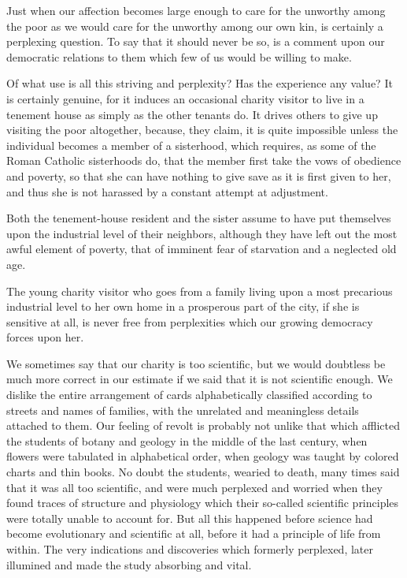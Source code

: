 \documentclass[]{article}
\begin{document}
\begin{sectionbody}
\addamsparagraph Just when our affection becomes large enough to care for the unworthy
among the poor as we would care for the unworthy among our own kin, is
certainly a perplexing question. To say that it should never be so, is a
comment upon our democratic relations to them which few of us would be
willing to make.

\addamsparagraph Of what use is all this striving and perplexity? Has the experience any
value? It is certainly genuine, for it induces an occasional charity
visitor to live in a tenement house as simply as the other tenants do.
It drives others to give up visiting the poor altogether, because, they
claim, it is quite impossible unless the individual becomes a member of
a sisterhood, which requires, as some of the Roman Catholic sisterhoods
do, that the member first take the vows of obedience and poverty, so
that she can have nothing to give save as it is first given to her, and
thus she is not harassed by a constant attempt at adjustment.

\addamsparagraph Both the tenement-house resident and the sister assume to have put
themselves upon the industrial level of their neighbors, although they
have left out the most awful element of poverty, that of imminent fear
of starvation and a neglected old age.

\addamsparagraph The young charity visitor who goes from a family living upon a most
precarious industrial level to her own home in a prosperous part of the
city, if she is sensitive at all, is never free from perplexities which
our growing democracy forces upon her.

\addamsparagraph We sometimes say that our charity is too scientific, but we would
doubtless be much more correct in our estimate if we said that it is not
scientific enough. We dislike the entire arrangement of cards
alphabetically classified according to streets and names of families,
with the unrelated and meaningless details attached to them. Our feeling
of revolt is probably not unlike that which afflicted the students of
botany and geology in the middle of the last century, when flowers were
tabulated in alphabetical order, when geology was taught by colored
charts and thin books. No doubt the students, wearied to death, many
times said that it was all too scientific, and were much perplexed and
worried when they found traces of structure and physiology which their
so-called scientific principles were totally unable to account for. But
all this happened before science had become evolutionary and scientific
at all, before it had a principle of life from within. The very
indications and discoveries which formerly perplexed, later illumined
and made the study absorbing and vital.


\end{sectionbody}
\end{document}
